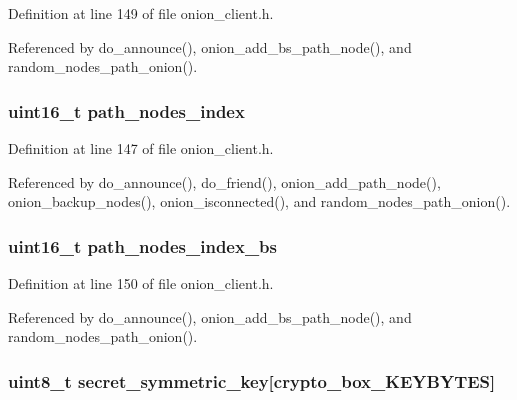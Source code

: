 Definition at line 149 of file onion\+\_\+client.\+h.



Referenced by do\+\_\+announce(), onion\+\_\+add\+\_\+bs\+\_\+path\+\_\+node(), and random\+\_\+nodes\+\_\+path\+\_\+onion().

\hypertarget{struct_onion___client_aaeb9402a72e98e04eb5cbc4ff0aac70e}{
\subsubsection[{path\+\_\+nodes\+\_\+index}]{\setlength{\rightskip}{0pt plus 5cm}uint16\+\_\+t path\+\_\+nodes\+\_\+index}}\label{struct_onion___client_aaeb9402a72e98e04eb5cbc4ff0aac70e}


Definition at line 147 of file onion\+\_\+client.\+h.



Referenced by do\+\_\+announce(), do\+\_\+friend(), onion\+\_\+add\+\_\+path\+\_\+node(), onion\+\_\+backup\+\_\+nodes(), onion\+\_\+isconnected(), and random\+\_\+nodes\+\_\+path\+\_\+onion().

\hypertarget{struct_onion___client_aa6cb02170665d966dec231613d9d229e}{
\subsubsection[{path\+\_\+nodes\+\_\+index\+\_\+bs}]{\setlength{\rightskip}{0pt plus 5cm}uint16\+\_\+t path\+\_\+nodes\+\_\+index\+\_\+bs}}\label{struct_onion___client_aa6cb02170665d966dec231613d9d229e}


Definition at line 150 of file onion\+\_\+client.\+h.



Referenced by do\+\_\+announce(), onion\+\_\+add\+\_\+bs\+\_\+path\+\_\+node(), and random\+\_\+nodes\+\_\+path\+\_\+onion().

\hypertarget{struct_onion___client_ab9f2ff47bc0b1e5110202a6e4be86390}{
\subsubsection[{secret\+\_\+symmetric\+\_\+key}]{\setlength{\rightskip}{0pt plus 5cm}uint8\+\_\+t secret\+\_\+symmetric\+\_\+key\mbox{[}{\bf crypto\+\_\+box\+\_\+\+K\+E\+Y\+B\+Y\+T\+E\+S}\mbox{]}}}\label{struct_onion___client_ab9f2ff47bc0b1e5110202a6e4be86390}


